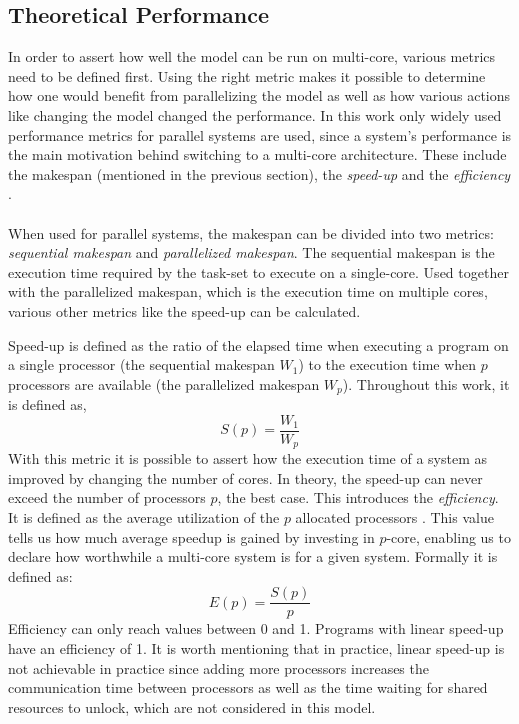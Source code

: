 \subsection{Theoretical Performance}
In order to assert how well the model can be run on multi-core, various metrics need to be defined first. Using the right metric makes it possible to determine how one would benefit from parallelizing the model as well as how various actions like changing the model changed the performance. In this work only widely used performance metrics for parallel systems are used, since a system’s performance is the main motivation behind switching to a multi-core architecture. These include the makespan (mentioned in the previous section), the \emph{speed-up} and the \emph{efficiency} \cite{grama2003}.

\paragraph{} When used for parallel systems, the makespan can be divided into two metrics: \emph{sequential makespan} and \emph{parallelized makespan}. The sequential makespan is the execution time required by the task-set to execute on a single-core. Used together with the parallelized makespan, which is the execution time on multiple cores, various other metrics like the speed-up can be calculated. 
\par Speed-up is defined as the ratio of the elapsed time when executing a program on a single processor (the sequential makespan $W_1$) to the execution time when $p$ processors are available (the parallelized makespan $W_p$)\cite{speedup}. Throughout this work, it is defined as,
\begin{equation}
    S(p) = \frac{W_1}{W_p}
\end{equation}
With this metric it is possible to assert how the execution time of a system as improved by changing the number of cores. In theory, the speed-up can never exceed the number of processors $p$, the best case. This introduces the \emph{efficiency}. It is defined as the average utilization of the $p$ allocated processors \cite{speedup}. This value tells us how much average speedup is gained by investing in $p$-core, enabling us to declare how worthwhile a multi-core system is for a given system. Formally it is defined as:
\begin{equation}
    E(p)=\frac{S(p)}{p}
\end{equation}
Efficiency can only reach values between 0 and 1. Programs with linear speed-up have an efficiency of 1. It is worth mentioning that in practice, linear speed-up is not achievable in practice since adding more processors increases the communication time between processors as well as the time waiting for shared resources to unlock, which are not considered in this model.

